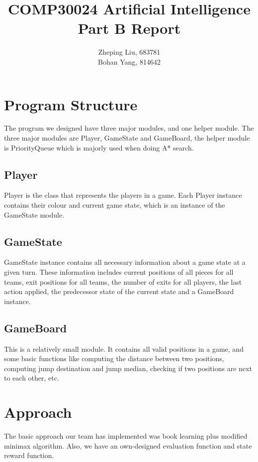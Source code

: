 \documentclass[UTF8,11pt]{article}
\title{COMP30024 Artificial Intelligence \\
       \textbf{Part B Report}}
\author{Zheping Liu, 683781 \\
        Bohan Yang, 814642}
\date{}
\begin{document}
    \maketitle
    \section{Program Structure}
        The program we designed have three major modules, and one helper module.
        The three major modules are Player, GameState and GameBoard, the helper
        module is PriorityQueue which is majorly used when doing A* search.
        \subsection{Player}
        Player is the class that represents the players in a game. Each
        Player instance contains their colour and current game state, which is an
        instance of the GameState module. 
        \subsection{GameState}
        GameState instance contains all necessary
        information about a game state at a given turn. These information includes
        current positions of all pieces for all teams, exit positions for all teams,
        the number of exits for all players, 
        the last action applied, the predecessor state of the current state and a GameBoard
        instance.
        \subsection{GameBoard}
        This is a relatively small module. It contains all valid positions in a game,
        and some basic functions like computing the distance between two positions,
        computing jump destination and jump median, checking if two positions are
        next to each other, etc.
    \section{Approach}
        The basic approach our team has implemented was book learning plus modified minimax
        algorithm. Also, we have an own-designed evaluation function and state reward function.
\end{document}
